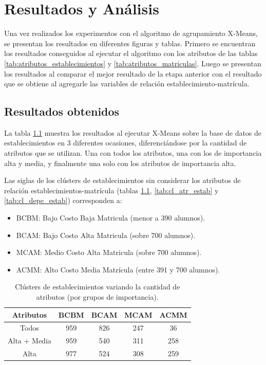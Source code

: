 \chapter{Resultados y Análisis}

Una vez realizados los experimentos con el algoritmo de agrupamiento X-Means, se presentan los resultados en diferentes figuras y tablas. Primero se encuentran los resultados conseguidos al ejecutar el algoritmo con los atributos de las tablas \ref{tab:atributos_establecimientos} y \ref{tab:atributos_matriculas}. Luego se presentan los resultados al comparar el mejor resultado de la etapa anterior con el resultado que se obtiene al agregarle las variables de relación establecimiento-matrícula.

\section{Resultados obtenidos}

La tabla \ref{tab:cl_estab} muestra los resultados al ejecutar X-Means sobre la base de datos de establecimientos en 3 diferentes ocasiones, diferenciándose por la cantidad de atributos que se utilizan. Una con todos los atributos, una con los de importancia alta y media, y finalmente una solo con los atributos de importancia alta.

Las siglas de los clústers de establecimientos sin considerar los atributos de relación establecimientos-matrícula (tablas \ref{tab:cl_estab}, \ref{tab:cl_atr_estab} y \ref{tab:cl_depe_estab}) corresponden a:

\begin{itemize}
    \item BCBM: Bajo Costo Baja Matricula (menor a 390 alumnos).
    \item BCAM: Bajo Costo Alta Matricula (sobre 700 alumnos).
    \item MCAM: Medio Costo Alta Matricula (sobre 700 alumnos).
    \item ACMM: Alto Costo Media Matrícula (entre 391 y 700 alumnos).
\end{itemize}

\begin{table}[H]
\centering
\caption{Clústers de establecimientos variando la cantidad de atributos (por grupos de importancia).}
\label{tab:cl_estab}
\begin{tabular}{|c|c|c|c|c|}
\hline
\textbf{Atributos} & \textbf{BCBM} & \textbf{BCAM} & \textbf{MCAM} & \textbf{ACMM}   \\ \hline
Todos & 959 & 826 & 247 & 36 \\ \hline
Alta + Media & 959 & 540 & 311 & 258 \\ \hline
Alta & 977 & 524 & 308 & 259\\ \hline
\end{tabular}
\end{table}


